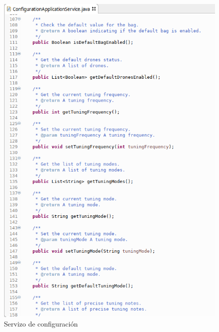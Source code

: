    \begin{figure}[htbp]
    \centering
    \includegraphics[scale=0.6, keepaspectratio=true]{./imagenes/servizo-configuracion-3.png}
    \caption{Servizo de configuración}
    \label{figura:ServizoConfiguracion3}
   \end{figure}
   
